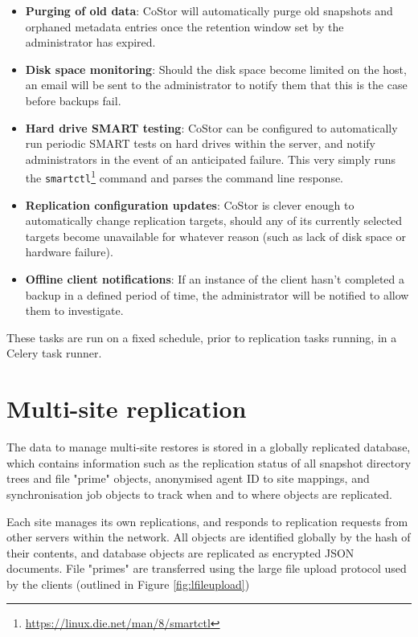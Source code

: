 \documentclass[bsc,frontabs,twoside,singlespacing,parskip,deptreport]{infthesis}     %
\begin{document}
\begin{itemize}
	\item \textbf{Purging of old data}:
	CoStor will automatically purge old snapshots and orphaned metadata entries once the retention
	window set by the administrator has expired.
	
	\item \textbf{Disk space monitoring}:
	Should the disk space become limited on the host, an email will be sent to the administrator
	to notify them that this is the case before backups fail.
	
	\item \textbf{Hard drive SMART testing}:
	CoStor can be configured to automatically run periodic SMART tests on hard drives within the 
	server, and notify administrators in the event of an anticipated failure. This very simply runs
	the \texttt{smartctl}\footnote{\url{https://linux.die.net/man/8/smartctl}} command and parses 
	the command line response.
	
	\item \textbf{Replication configuration updates}:
	CoStor is clever enough to automatically change replication targets, should any of its currently 
	selected targets become unavailable for whatever reason (such as lack of disk space or hardware 
	failure).
	
	\item \textbf{Offline client notifications}:
	If an instance of the client hasn't completed a backup in a defined period of time, the 
	administrator will be notified to allow them to investigate.
\end{itemize}

These tasks are run on a fixed schedule, prior to replication tasks running, in a Celery task
runner.

\chapter{Multi-site replication}


The data to manage multi-site restores is stored in a globally replicated database, which 
contains information such as the replication status of all snapshot directory trees and file 
"prime" objects, anonymised agent ID to site mappings, and synchronisation job objects to track
when and to where objects are replicated.

Each site manages its own replications, and responds to replication requests from other servers
within the network. All objects are identified globally by the hash of their contents, and 
database objects are replicated as encrypted JSON documents. File "primes" are transferred using
the large file upload protocol used by the clients (outlined in Figure \ref{fig:lfileupload})
\end{document}
